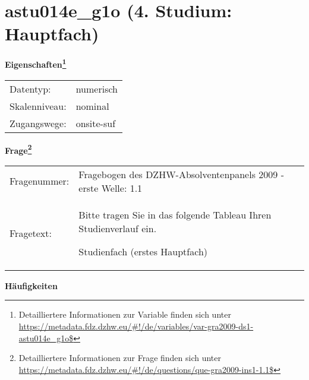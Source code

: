 
    \setcounter{footnote}{0}

    \vspace*{-1.8cm}
	\section{astu014e\_g1o (4. Studium: Hauptfach)}
	\label{section:astu014e_g1o}



    \vspace*{0.5cm}
    \noindent\textbf{Eigenschaften\footnote{Detailliertere Informationen zur Variable finden sich unter
		\url{https://metadata.fdz.dzhw.eu/\#!/de/variables/var-gra2009-ds1-astu014e_g1o$}}}\\
	\begin{tabularx}{\hsize}{@{}lX}
	Datentyp: & numerisch \\
	Skalenniveau: & nominal \\
	Zugangswege: &
	  onsite-suf
 \\
    \end{tabularx}



				\vspace*{0.5cm}
                \noindent\textbf{Frage\footnote{Detailliertere Informationen zur Frage finden sich unter
		              \url{https://metadata.fdz.dzhw.eu/\#!/de/questions/que-gra2009-ins1-1.1$}}}\\
				\begin{tabularx}{\hsize}{@{}lX}
					Fragenummer: &
					  Fragebogen des DZHW-Absolventenpanels 2009 - erste Welle:
					  1.1
 \\
					Fragetext: & Bitte tragen Sie in das folgende Tableau Ihren Studienverlauf ein.\par  Studienfach (erstes Hauptfach) \\
				\end{tabularx}





        		\vspace*{0.5cm}
                \noindent\textbf{Häufigkeiten}

